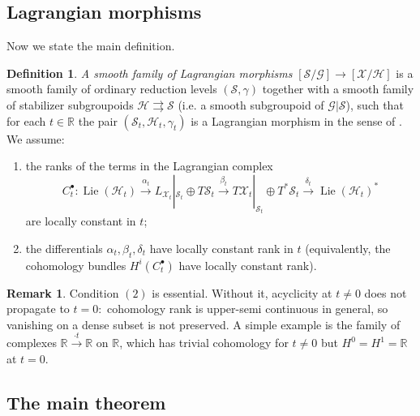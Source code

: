 \documentclass[reqno]{amsart}
\theoremstyle{plain}
\theoremstyle{definition}
\newtheorem{Def}[Thm]{Definition}
\newtheorem{Rem}[Thm]{Remark}
\newcommand{\R}{\mathbb{R}}
\newcommand{\G}{\mathcal{G}}
\renewcommand{\H}{\mathcal{H}}
\newcommand{\too}{\longrightarrow}
\renewcommand{\S}{\mathcal{S}}
\newcommand{\X}{\mathcal{X}}
\newcommand{\Lie}{\operatorname{Lie}}
\begin{document}
\subsection{Lagrangian morphisms}
Now we state the main definition.
\begin{Def} \label{def:family-lag}
\textit{A smooth family of Lagrangian morphisms} $[\S/\G] \too [\X/\H]$ is a smooth family of ordinary reduction levels $(\S,\gamma)$ together with a smooth family of stabilizer subgroupoids $\H \rightrightarrows \S$ (i.e. a smooth subgroupoid of $\G|\S$), such that for each $t \in \R$ the pair $(\S_t,\H_t,\gamma_t)$ is a Lagrangian morphism in the sense of \cite[Theorem 5.6]{bualibanu2026reduction}. We assume: 

\begin{enumerate}[]
  \item the ranks of the terms in the Lagrangian complex
  \begin{equation}\label{eq:Lag-complex}
    C^\bullet_t \colon \Lie(\H_t) \xrightarrow{\alpha_t} L_{\X_t}|_{\S_t} \oplus T\S_t \xrightarrow{\beta_t} T\X_t|_{\S_t} \oplus T^*\S_t \xrightarrow{\delta_t} \Lie(\H_t)^*
  \end{equation}
  are locally constant in $t$;
  \item the differentials $\alpha_t, \beta_t, \delta_t$ have locally constant rank in $t$ (equivalently, the cohomology bundles $H^i(C^\bullet_t)$ have locally constant rank).
\end{enumerate}
\end{Def}


\begin{Rem}
Condition $(2)$ is essential. Without it, acyclicity at $t \neq 0$ does not propagate to $t = 0:$ cohomology rank is upper-semi continuous in general, so vanishing on a dense subset is not preserved. A simple example is the family of complexes $\R \xrightarrow{\cdot t} \R$ on $\R$, which has trivial cohomology for $t\neq 0$ but $H^{0} = H^{1} = \R$ at  $t = 0.$
\end{Rem}


\subsection{The main theorem}
 
\end{document}
